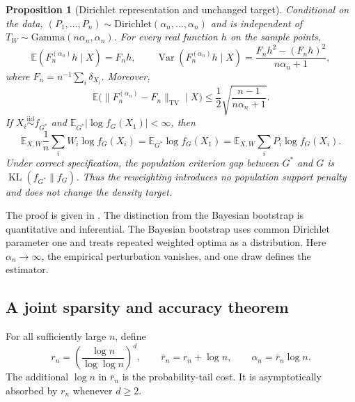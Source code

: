 \documentclass[11pt]{article}
\newtheorem{proposition}[proposition]{Proposition}
\theoremstyle{definition}
\theoremstyle{remark}
\DeclareMathOperator{\KL}{KL}
\DeclareMathOperator{\TV}{TV}
\newcommand{\EE}{\mathbb E}
\newcommand{\norm}[1]{\lVert #1\rVert}
\newcommand{\abs}[1]{\lvert #1\rvert}
\begin{document}
\begin{proposition}[Dirichlet representation and unchanged target]
\label{prop:dirichlet}
Conditional on the data,
$(P_1,\ldots,P_n)\sim\mathrm{Dirichlet}(\alpha_n,\ldots,\alpha_n)$ and is
independent of $T_W\sim\mathrm{Gamma}(n\alpha_n,\alpha_n)$.  For every real
function $h$ on the sample points,
\[
 \EE(F_n^{(\alpha_n)}h\mid X)=F_nh,
 \qquad
 \operatorname{Var}(F_n^{(\alpha_n)}h\mid X)
 =\frac{F_nh^2-(F_nh)^2}{n\alpha_n+1},
\]
where $F_n=n^{-1}\sum_i\delta_{X_i}$.  Moreover,
\[
 \EE\bigl(\norm{F_n^{(\alpha_n)}-F_n}_{\TV}\mid X\bigr)
 \le \frac12\sqrt{\frac{n-1}{n\alpha_n+1}}.
\]
If $X_i\stackrel{\mathrm{iid}}\sim f_{G^*}$ and
$\EE_{G^*}\abs{\log f_G(X_1)}<\infty$, then
\[
 \EE_{X,W}\frac1n\sum_iW_i\log f_G(X_i)
 =\EE_{G^*}\log f_G(X_1)
 =\EE_{X,W}\sum_iP_i\log f_G(X_i).
\]
Under correct specification, the population criterion gap between $G^*$ and
$G$ is $\KL(f_{G^*}\|f_G)$.  Thus the reweighting introduces no population
support penalty and does not change the density target.
\end{proposition}

The proof is given in .  The distinction from the
Bayesian bootstrap is quantitative and inferential.  The Bayesian bootstrap
uses common Dirichlet parameter one and treats repeated weighted optima as a
distribution.  Here $\alpha_n\to\infty$, the empirical perturbation vanishes,
and one draw defines the estimator.

\subsection{A joint sparsity and accuracy theorem}

For all sufficiently large $n$, define
\begin{equation}\label{eq:scales}
 r_n=\left(\frac{\log n}{\log\log n}\right)^d,
 \qquad \bar r_n=r_n+\log n,
 \qquad \alpha_n=\bar r_n\log n.
\end{equation}
The additional $\log n$ in $\bar r_n$ is the probability-tail cost.  It is
asymptotically absorbed by $r_n$ whenever $d\ge2$.
\end{document}
